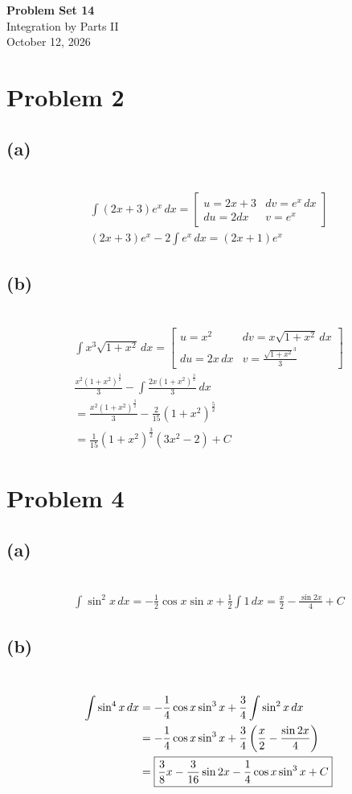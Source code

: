 \documentclass[12pt]{article}
\newcommand*{\paren}[1]{\ensuremath\left(#1\right)}
\newcommand{\problem}[1]{\section{Problem #1}}
\newcommand{\subproblem}[1]{\subsection{(#1)} \,}
\begin{document}
\vspace*{0cm}

\begin{center}
    {\Large \bfseries Problem Set 14} \\[0.5cm]
    {\large Integration by Parts II} \\[0.35cm]
    {\normalsize October 12, 2026}
\end{center}


\problem{2}

\subproblem{a}
\begin{gather*}
    \int (2x+3)e^x\, dx = \begin{bmatrix}
        u =2x+3 & dv=e^x \, dx\\
        du=2dx  & v=e^x
    \end{bmatrix}\\
    (2x+3)e^x - 2\int  e^x\, dx = \boxed{(2x+1)e^x}
\end{gather*}

\subproblem{b}
\begin{gather*}
    \int x^3 \sqrt{1+x^2} \, dx = 
    \begin{bmatrix}
        u=x^2 & dv = x \sqrt{1+x^2} \, dx\\
        du = 2x\, dx & v=\frac{\sqrt{1+x^2}^3}{3}
    \end{bmatrix}\\
    \frac{x^2(1+x^2)^\frac{3}{2}}{3} -\int  \frac{2x(1+x^2)^\frac{3}{2}}{3} \, dx\\
    = \frac{x^2(1+x^2)^\frac{3}{2}}{3} - \frac{2}{15}(1+x^2)^\frac{5}{2}\\
    = \boxed{ \frac{1}{15}(1+x^2)^\frac{3}{2}(3x^2-2)+C}
\end{gather*}

\problem{4}

\subproblem{a}
\begin{gather*}
    \int \sin^2 x \,d x= - \frac{1}{2}\cos x \sin x + \frac{1}{2} \int 1\, dx = \boxed{\frac{x}{2}-\frac{\sin 2x}{4}+C}
\end{gather*}

\subproblem{b}
\begin{align*}
    \int \sin ^4 x\, dx &= -\frac{1}{4}\cos x \sin^3 x+\frac{3}{4} \int \sin^2 x\, dx\\
    & =-\frac{1}{4}\cos x \sin^3 x +\frac{3}{4} \paren{\frac{x}{2}-\frac{\sin 2x}{4}}\\
    &= \boxed{ \frac{3}{8}x - \frac{3}{16}\sin 2x -\frac{1}{4}\cos x \sin^3 x + C}
\end{align*}
\end{document}
